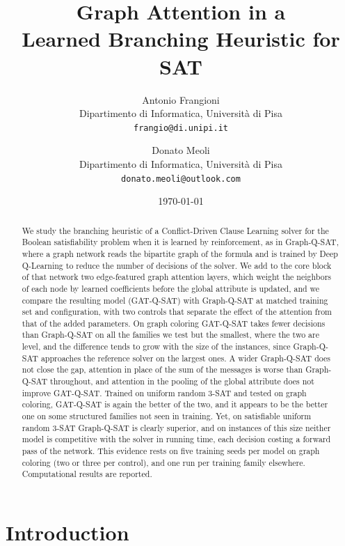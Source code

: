 \documentclass[11pt,a4paper]{article}
\title{Graph Attention in a\\ Learned Branching Heuristic for {SAT}}
\author{Antonio Frangioni\\
        Dipartimento di Informatica, Universit{\`a} di Pisa\\
        {\tt frangio@di.unipi.it}
        \and
        Donato Meoli\\
        Dipartimento di Informatica, Universit{\`a} di Pisa\\
        {\tt donato.meoli@outlook.com}
        }
\date{\today}
\begin{document}
\maketitle

\begin{abstract}
We study the branching heuristic of a Conflict-Driven Clause Learning solver
for the Boolean satisfiability problem when it is learned by reinforcement, as
in Graph-Q-SAT, where a graph network reads the bipartite graph of the formula
and is trained by Deep Q-Learning to reduce the number of decisions of the
solver. We add to the core block of that network two edge-featured graph
attention layers, which weight the neighbors of each node by learned
coefficients before the global attribute is updated, and we compare the
resulting model (GAT-Q-SAT) with Graph-Q-SAT at matched training set and
configuration, with two controls that separate the effect of the
attention from that of the added parameters. On graph coloring GAT-Q-SAT takes
fewer decisions than Graph-Q-SAT on all the families we test but the
smallest, where the two are level, and the difference tends to grow with the
size of the instances, since Graph-Q-SAT approaches the reference solver on the
largest ones. A wider Graph-Q-SAT does not close the gap,
attention in place of the sum of the messages is worse than Graph-Q-SAT
throughout, and attention in the pooling of the global attribute does not
improve GAT-Q-SAT. Trained on uniform random 3-SAT
and tested on graph coloring, GAT-Q-SAT is again the better of the two, and it appears to be the better one on some structured families not seen in
training. Yet, on satisfiable uniform random 3-SAT
Graph-Q-SAT is clearly superior, and on instances of this size neither model is
competitive with the solver in running time, each decision costing a forward
pass of the network. This evidence rests on five training seeds per model on
graph coloring (two or three per control), and one run per training family elsewhere. Computational results are reported.
\end{abstract}

\section{Introduction}\label{sec:intro}
\end{document}
